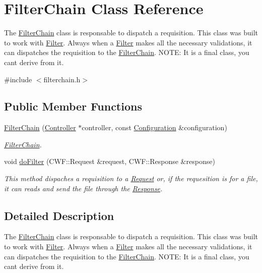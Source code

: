 \hypertarget{class_filter_chain}{}\section{Filter\+Chain Class Reference}
\label{class_filter_chain}


The \hyperlink{class_filter_chain}{Filter\+Chain} class is responsable to dispatch a requisition. This class was built to work with \hyperlink{class_filter}{Filter}. Always when a \hyperlink{class_filter}{Filter} makes all the necessary validations, it can dispatches the requisition to the \hyperlink{class_filter_chain}{Filter\+Chain}. N\+O\+TE\+: It is a final class, you can\textquotesingle{}t derive from it.  




{\ttfamily \#include $<$filterchain.\+h$>$}

\subsection*{Public Member Functions}
\begin{DoxyCompactItemize}
\item 
\hyperlink{class_filter_chain_a9d506944c4a8d387aae3c7b0aa7c6ac7}{Filter\+Chain} (\hyperlink{class_controller}{Controller} $\ast$controller, const \hyperlink{class_configuration}{Configuration} \&configuration)
\begin{DoxyCompactList}\small\item\em \hyperlink{class_filter_chain}{Filter\+Chain}. \end{DoxyCompactList}\item 
void \hyperlink{class_filter_chain_a873d7d3362388c2b7f2e958e8971be94}{do\+Filter} (C\+W\+F\+::\+Request \&request, C\+W\+F\+::\+Response \&response)
\begin{DoxyCompactList}\small\item\em This method dispaches a requisition to a \hyperlink{class_request}{Request} or, if the requesition is for a file, it can reads and send the file through the \hyperlink{class_response}{Response}. \end{DoxyCompactList}\end{DoxyCompactItemize}


\subsection{Detailed Description}
The \hyperlink{class_filter_chain}{Filter\+Chain} class is responsable to dispatch a requisition. This class was built to work with \hyperlink{class_filter}{Filter}. Always when a \hyperlink{class_filter}{Filter} makes all the necessary validations, it can dispatches the requisition to the \hyperlink{class_filter_chain}{Filter\+Chain}. N\+O\+TE\+: It is a final class, you can\textquotesingle{}t derive from it. 

